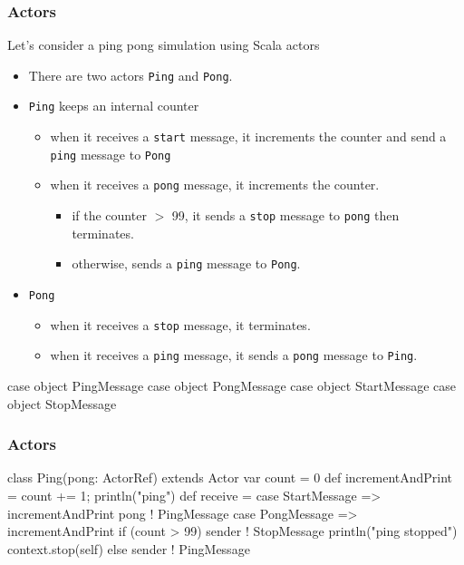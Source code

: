 \documentclass{beamer}
\newcommand{\beb}{\begin{exampleblock}}
\newcommand{\eeb}{\end{exampleblock}}
\begin{document}
\begin{frame}[fragile]
\frametitle{Actors}
Let's consider a ping pong simulation using Scala actors

\begin{itemize}
\item There are two actors {\tt Ping} and {\tt Pong}. 
\item {\tt Ping} keeps an internal counter
   \begin{itemize}
      \item when it receives a {\tt start} message, 
        it increments the counter and send a {\tt ping} message to {\tt Pong}
       \item when it receives a {\tt pong} message, it increments the
         counter. 
           \begin{itemize} 
               \item if the counter $>$ 99, it sends a {\tt stop}
                 message to {\tt pong} then terminates.
               \item  otherwise, sends a {\tt ping} message to {\tt Pong}.
           \end{itemize}
   \end{itemize}
\item {\tt Pong} 
  \begin{itemize}
    \item when it receives a {\tt stop} message, it terminates.
    \item when it receives a {\tt ping} message, it sends a {\tt pong}
      message to {\tt Ping}.
  \end{itemize}
\end{itemize}

\beb{}
\begin{code}
case object PingMessage
case object PongMessage
case object StartMessage
case object StopMessage
\end{code}
\eeb
\end{frame}


\begin{frame}[fragile]
\frametitle{Actors}
\beb{}
\begin{code}
class Ping(pong: ActorRef) extends Actor {
  var count = 0
  def incrementAndPrint = {count += 1; println("ping")}
  def receive = {
    case StartMessage => 
      incrementAndPrint
      pong ! PingMessage
    case PongMessage => 
      incrementAndPrint
      if (count > 99) {
        sender ! StopMessage
        println("ping stopped")
        context.stop(self)
      } 
      else { sender ! PingMessage }
  }
}
\end{code}
\eeb
\end{frame}
\end{document}
